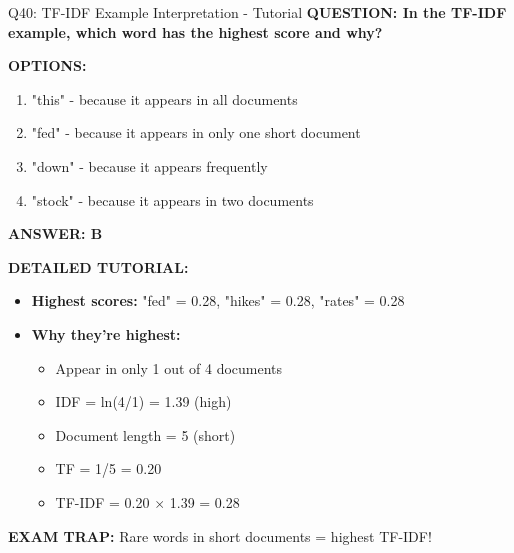 \documentclass[8pt]{beamer}
\begin{document}
	\begin{frame}{Q40: TF-IDF Example Interpretation - Tutorial}
		\fontsize{6.5}{7.5}\selectfont
		\textbf{QUESTION: In the TF-IDF example, which word has the highest score and why?}
		
		\vspace{0.1cm}
		\textbf{OPTIONS:}
		\begin{enumerate}
			\item "this" - because it appears in all documents
			\item "fed" - because it appears in only one short document
			\item "down" - because it appears frequently
			\item "stock" - because it appears in two documents
		\end{enumerate}
		
		\vspace{0.1cm}
		\textcolor{myblue}{\textbf{ANSWER: B}}
		
		\vspace{0.1cm}
		\textbf{DETAILED TUTORIAL:}
		\begin{itemize}
			\item \textbf{Highest scores:} "fed" = 0.28, "hikes" = 0.28, "rates" = 0.28
			\item \textbf{Why they're highest:}
			\begin{itemize}
				\item Appear in only 1 out of 4 documents
				\item IDF = ln(4/1) = 1.39 (high)
				\item Document length = 5 (short)
				\item TF = 1/5 = 0.20
				\item TF-IDF = 0.20 $\times$ 1.39 = 0.28
			\end{itemize}
		\end{itemize}
		
		\textcolor{myred}{\textbf{EXAM TRAP:}} Rare words in short documents = \textcolor{myblue}{highest TF-IDF}!
	\end{frame}
	
	
\end{document}
